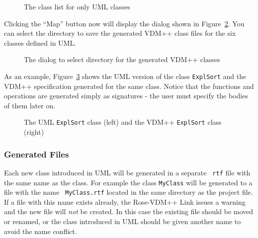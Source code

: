 \documentclass[\pformat,12pt]{article}
\newcommand{\vdmpp}{VDM++}
\newcommand{\link}{Rose-\vdmpp{} Link}
\begin{document}
\begin{figure}[htb]
\begin{center}
\mbox{}
\caption{The class list for only UML classes\label{fig:UMLtoVDM}}
\end{center}
\end{figure}

Clicking the ``Map'' button now will display the dialog shown in Figure~\ref{fig:selectDirectory}.
You can select the directory to save the generated \vdmpp{} class files for the
six classes defined in UML.

\begin{figure}[!htb]
\begin{center}
\mbox{}
\caption{The dialog to select directory for the generated \vdmpp{} classes \label{fig:selectDirectory}}
\end{center}
\end{figure}
As an example, Figure~\ref{fig:ExplSortVDMUML} shows the UML version of the class
{\tt ExplSort} and the \vdmpp{} specification generated for the same class. 
Notice that
the functions and operations are generated simply as signatures - the
user must specify the bodies of them later on.

\begin{figure}[htb]
\begin{center}
\mbox{}
\hspace{0.2cm}
\caption{The UML {\tt ExplSort} class (left) and the \vdmpp{} {\tt ExplSort} class (right)\label{fig:ExplSortVDMUML}}
\end{center}
\end{figure}

\subsubsection*{Generated Files}

Each new class introduced in UML will be generated in a separate {\tt
  rtf} file with the same name as the class. For example the class
{\tt MyClass} will be generated to a file with the name {\tt
  MyClass.rtf} located in the same directory as the project file. If a
file with this name exists already, the \link{} issues a warning and
the new file will {\em not} be created. In this case the existing file
should be moved or renamed, or the class introduced in UML should be given
another name to avoid the name conflict.
\end{document}
